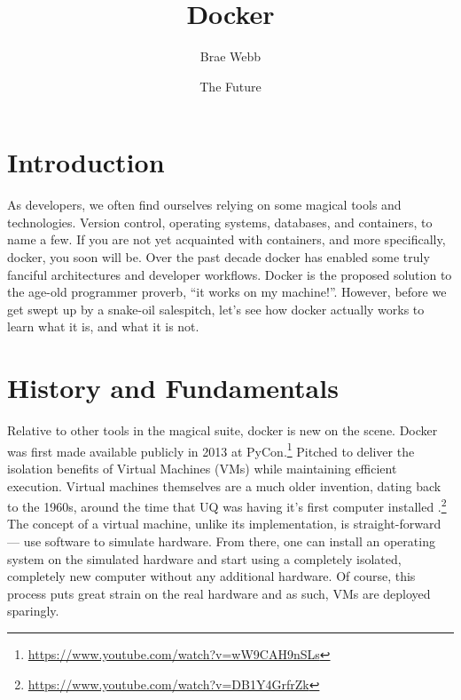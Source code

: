 \documentclass{csse4400}
\title{Docker}
\author{Brae Webb}
\date{{\color{red} The Future}}
\begin{document}
\makecover

\maketitle

\section{Introduction}
As developers, we often find ourselves relying on some magical tools and technologies.
Version control, operating systems, databases, and containers, to name a few.
If you are not yet acquainted with containers, and more specifically, docker, you soon will be.
Over the past decade docker has enabled some truly fanciful architectures and developer workflows.
Docker is the proposed solution to the age-old programmer proverb, ``it works on my machine!''.
However, before we get swept up by a snake-oil salespitch, let's see how docker actually works to learn what it is, and what it is not.

\section{History and Fundamentals}
Relative to other tools in the magical suite, docker is new on the scene.
Docker was first made available publicly in 2013 at PyCon.\footnote{\url{https://www.youtube.com/watch?v=wW9CAH9nSLs}}
Pitched to deliver the isolation benefits of Virtual Machines (VMs) while maintaining efficient execution.
Virtual machines themselves are a much older invention, dating back to the 1960s, around the time that UQ was having it's first computer installed%
.\footnote{\url{https://www.youtube.com/watch?v=DB1Y4GrfrZk}}
The concept of a virtual machine, unlike its implementation, is straight-forward --- use software to simulate hardware.
From there, one can install an operating system on the simulated hardware and start using a completely isolated, completely new computer without any additional hardware.
Of course, this process puts great strain on the real hardware and as such, VMs are deployed sparingly.
\end{document}
